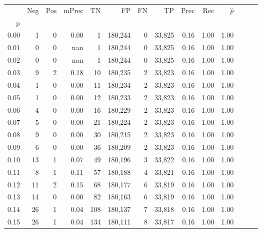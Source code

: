 \begin{tabular}{rrrrrrrrrrrrrr}
\toprule
{} &    Neg &    Pos & mPrec &       TN &       FP &      FN &      TP &  Prec &   Rec & $\hat{p}$ \\
p    &        &        &       &          &          &         &         &       &       &           \\
\midrule
0.00 &      1 &      0 &  0.00 &        1 &  180,244 &       0 &  33,825 &  0.16 &  1.00 &      1.00 \\
0.01 &      0 &      0 &   nan &        1 &  180,244 &       0 &  33,825 &  0.16 &  1.00 &      1.00 \\
0.02 &      0 &      0 &   nan &        1 &  180,244 &       0 &  33,825 &  0.16 &  1.00 &      1.00 \\
0.03 &      9 &      2 &  0.18 &       10 &  180,235 &       2 &  33,823 &  0.16 &  1.00 &      1.00 \\
0.04 &      1 &      0 &  0.00 &       11 &  180,234 &       2 &  33,823 &  0.16 &  1.00 &      1.00 \\
0.05 &      1 &      0 &  0.00 &       12 &  180,233 &       2 &  33,823 &  0.16 &  1.00 &      1.00 \\
0.06 &      4 &      0 &  0.00 &       16 &  180,229 &       2 &  33,823 &  0.16 &  1.00 &      1.00 \\
0.07 &      5 &      0 &  0.00 &       21 &  180,224 &       2 &  33,823 &  0.16 &  1.00 &      1.00 \\
0.08 &      9 &      0 &  0.00 &       30 &  180,215 &       2 &  33,823 &  0.16 &  1.00 &      1.00 \\
0.09 &      6 &      0 &  0.00 &       36 &  180,209 &       2 &  33,823 &  0.16 &  1.00 &      1.00 \\
0.10 &     13 &      1 &  0.07 &       49 &  180,196 &       3 &  33,822 &  0.16 &  1.00 &      1.00 \\
0.11 &      8 &      1 &  0.11 &       57 &  180,188 &       4 &  33,821 &  0.16 &  1.00 &      1.00 \\
0.12 &     11 &      2 &  0.15 &       68 &  180,177 &       6 &  33,819 &  0.16 &  1.00 &      1.00 \\
0.13 &     14 &      0 &  0.00 &       82 &  180,163 &       6 &  33,819 &  0.16 &  1.00 &      1.00 \\
0.14 &     26 &      1 &  0.04 &      108 &  180,137 &       7 &  33,818 &  0.16 &  1.00 &      1.00 \\
0.15 &     26 &      1 &  0.04 &      134 &  180,111 &       8 &  33,817 &  0.16 &  1.00 &      1.00 \\

\end{tabular}
